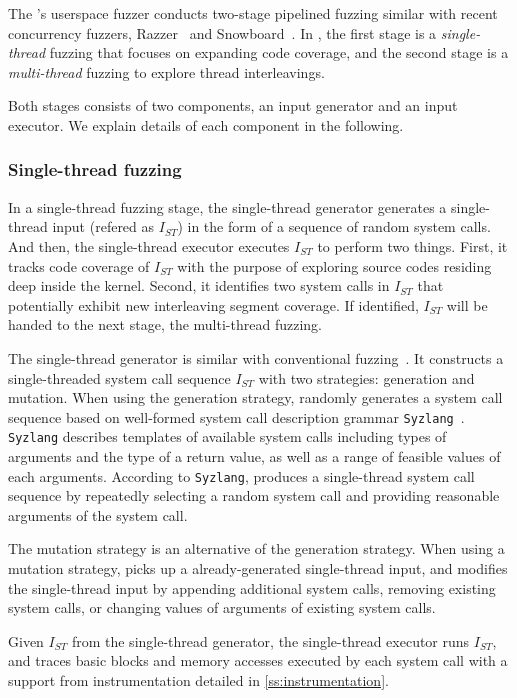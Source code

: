 The \sys's userspace fuzzer conducts two-stage pipelined fuzzing
similar with recent concurrency fuzzers, Razzer~\cite{razzer} and
Snowboard~\cite{snowboard}.
%
In \sys, the first stage is a \textit{single-thread} fuzzing that
focuses on expanding code coverage\dr{}, and the second stage is a
\textit{multi-thread} fuzzing to explore thread interleavings.

Both stages consists of two components, an input generator and an
input executor. We explain details of each component in the following.


\subsubsection{Single-thread fuzzing}
%
In a single-thread fuzzing stage, the single-thread generator
generates a single-thread input (refered as $I_{ST}$) in the form of a
sequence of random system calls.
%
And then, the single-thread executor executes $I_{ST}$ to perform two
things.
%
First, it tracks code coverage of $I_{ST}$ with the purpose of
exploring source codes residing deep inside the kernel.
%
Second, it identifies two system calls in $I_{ST}$ that potentially
exhibit new interleaving segment coverage.  If identified, $I_{ST}$
will be handed to the next stage, the multi-thread fuzzing.


%
The single-thread generator is similar with conventional
fuzzing~\cite{syzkaller}.
%
It constructs a single-threaded system call sequence $I_{ST}$ with two
strategies: generation and mutation.
%
When using the generation strategy, \sys randomly generates a system
call sequence based on well-formed system call description grammar
\texttt{Syzlang}~\cite{syzlang}.
%
\texttt{Syzlang} describes templates of available system calls
including types of arguments and the type of a return value, as well
as a range of feasible values of each arguments.
%
According to \texttt{Syzlang}, \sys produces a single-thread system
call sequence by repeatedly selecting a random system call and
providing reasonable arguments of the system call.

The mutation strategy is an alternative of the generation strategy.
When using a mutation strategy, \sys picks up a already-generated
single-thread input, and modifies the single-thread input by appending
additional system calls, removing existing system calls, or changing
values of arguments of existing system calls.


%
Given $I_{ST}$ from the single-thread generator, the single-thread
executor runs $I_{ST}$, and traces basic blocks and memory accesses
executed by each system call with a support from instrumentation
detailed in \autoref{ss:instrumentation}.

